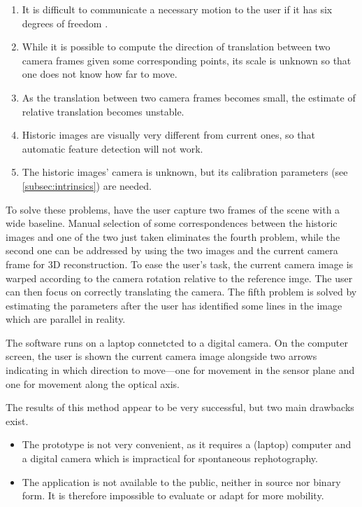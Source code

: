 \begin{enumerate}
   \item It is difficult to communicate a necessary motion to the user if it has
      six degrees of freedom .
   \item While it is possible to compute the direction of translation between
      two camera frames given some corresponding points, its scale is unknown so
      that one does not know how far to move.
   \item As the translation between two camera frames becomes small, the
      estimate of relative translation becomes unstable.
   \item Historic images are visually very different from current ones, so that
      automatic feature detection will not work.
   \item The historic images' camera is unknown, but its calibration parameters
      (see \autoref{subsec:intrinsics}) are needed.
\end{enumerate}

To solve these problems, \citet{bae2010} have the user capture two frames of the
scene with a wide baseline. Manual selection of some correspondences between the
historic images and one of the two just taken eliminates the fourth problem,
while the second one can be addressed by using the two images and the current
camera frame for 3D reconstruction. To ease the user's task, the current camera
image is warped according to the camera rotation relative to the reference imge.
The user can then
focus on correctly translating the camera. The fifth problem is solved by
estimating the parameters after the user has identified some lines in the image
which are parallel in reality.

The software runs on a laptop connetcted to a digital camera. On the computer
screen, the user is shown the current camera image alongside two arrows
indicating in which direction to move---one for movement in the sensor plane and
one for movement along the optical axis.

The results of this method appear to be very successful, but two main drawbacks
exist.

\begin{itemize}
   \item The prototype is not very convenient, as it requires a (laptop)
      computer and a digital camera which is impractical for
      spontaneous rephotography.
   \item The application is not available to the public, neither in source nor
      binary form. It is therefore impossible to evaluate or adapt for more mobility.
\end{itemize}

